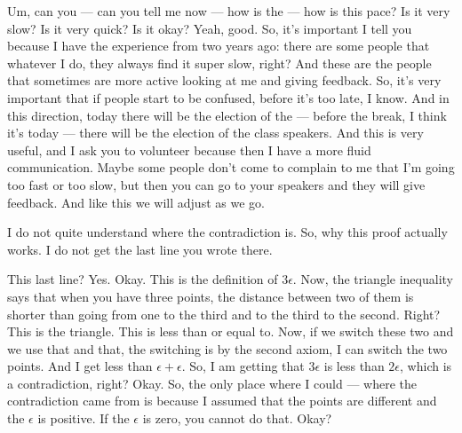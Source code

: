 
\begin{spoken-clean}[00:12:38 - 00:14:14]
Um, can you — can you tell me now — how is the — how is this pace? Is it very slow? Is it very quick? Is it okay? Yeah, good. So, it's important I tell you because I have the experience from two years ago: there are some people that whatever I do, they always find it super slow, right? And these are the people that sometimes are more active looking at me and giving feedback. So, it's very important that if people start to be confused, before it's too late, I know. And in this direction, today there will be the election of the — before the break, I think it's today — there will be the election of the class speakers. And this is very useful, and I ask you to volunteer because then I have a more fluid communication. Maybe some people don't come to complain to me that I'm going too fast or too slow, but then you can go to your speakers and they will give feedback. And like this we will adjust as we go.
\end{spoken-clean}

\begin{student-interaction}
I do not quite understand where the contradiction is. So, why this proof actually works. I do not get the last line you wrote there.
\end{student-interaction}

\begin{spoken-clean}[continued]
This last line?  Yes. Okay. This is the definition of $3\epsilon$. Now, the triangle inequality says that when you have three points, the distance between two of them is shorter than going from one to the third and to the third to the second. Right? This is the triangle. This is less than or equal to. Now, if we switch these two and we use that and that, the switching is by the second axiom, I can switch the two points. And I get less than $\epsilon + \epsilon$. So, I am getting that $3\epsilon$ is less than $2\epsilon$, which is a contradiction, right? Okay. So, the only place where I could — where the contradiction came from is because I assumed that the points are different and the $\epsilon$ is positive. If the $\epsilon$ is zero, you cannot do that. Okay?
\end{spoken-clean}


